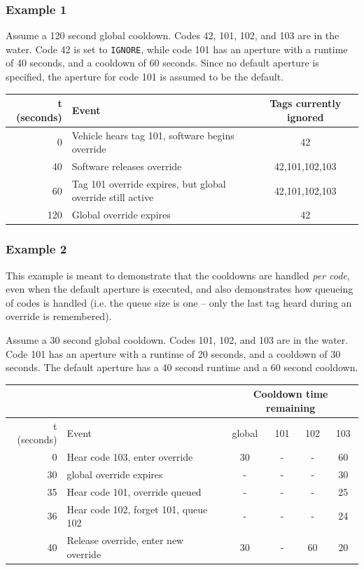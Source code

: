 \documentclass[11pt]{article} %
\begin{document}
\subsubsection*{Example 1}
Assume a 120 second global cooldown. Codes 42, 101, 102, and 103 are in the water. Code 42 is set to \mbox{\texttt{IGNORE}}, while code 101 has an
aperture with a runtime of 40 seconds, and a cooldown of 60 seconds. Since no default aperture is specified, the aperture for code 101 is assumed to be
the default.
\\


\begin{tabular}{|r||l|c|}
\hline
t (seconds) & Event & Tags currently ignored\\
\hline
0 & Vehicle hears tag 101, software begins override & 42\\
40 & Software releases override &  42,101,102,103\\
60 & Tag 101 override expires, but global override still active & 42,101,102,103\\
120 & Global override expires & 42\\
\hline
\end{tabular}

\subsubsection*{Example 2}
This example is meant to demonstrate that the cooldowns are handled \emph{per code}, even when the default aperture is executed, and also
demonstrates how queueing of codes is handled (i.e. the queue size is one -- only the last tag heard during an override is remembered).

Assume a 30 second global cooldown. Codes 101, 102, and 103 are in the water. Code 101 has an
aperture with a runtime of 20 seconds, and a cooldown of 30 seconds. The default aperture has a 40 second runtime and a 60 second cooldown.
\\

\begin{tabular}{|r||l|c|c|c|c|}
\hline
 & & \multicolumn{4}{|c|}{Cooldown time remaining} \\
\hline
t (seconds) & Event & global & 101 & 102 & 103 \\
\hline
0 & Hear code 103, enter override & 30 & - & - & 60 \\
30 & global override expires & - & - & - & 30 \\
35 & Hear code 101, override queued & - & - & - & 25 \\
36 & Hear code 102, forget 101, queue 102 & - & - & - & 24 \\
40 & Release override, enter new override & 30 & - & 60 & 20 \\
\hline
\end{tabular}
\\
\end{document}
